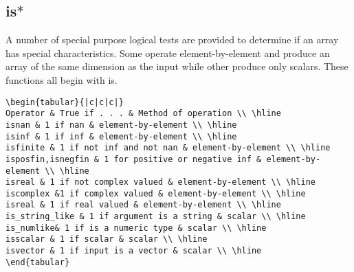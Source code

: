 \documentclass[KSmain.tex]{subfiles}
\begin{document}
\subsection{ is$\ast$}
A number of special purpose logical tests are provided to determine if an array has special characteristics.
Some operate element-by-element and produce an array of the same dimension as the input while other
produce only scalars. These functions all begin with is.

\begin{verbatim}
\begin{tabular}{|c|c|c|}
Operator & True if . . . & Method of operation \\ \hline
isnan & 1 if nan & element-by-element \\ \hline
isinf & 1 if inf & element-by-element \\ \hline
isfinite & 1 if not inf and not nan & element-by-element \\ \hline
isposfin,isnegfin & 1 for positive or negative inf & element-by-element \\ \hline
isreal & 1 if not complex valued & element-by-element \\ \hline
iscomplex &1 if complex valued & element-by-element \\ \hline
isreal & 1 if real valued & element-by-element \\ \hline
is_string_like & 1 if argument is a string & scalar \\ \hline
is_numlike& 1 if is a numeric type & scalar \\ \hline
isscalar & 1 if scalar & scalar \\ \hline
isvector & 1 if input is a vector & scalar \\ \hline
\end{tabular}
\end{verbatim}
\end{document}
